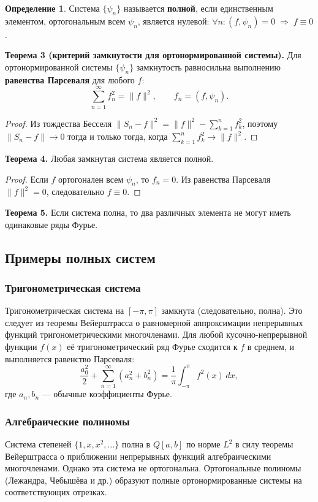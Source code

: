 \documentclass{article}
\theoremstyle{definition}
\newtheorem{definition}{Определение}
\begin{document}
\begin{definition}
Система $\{\psi_n\}$ называется \textbf{полной}, если единственным элементом, ортогональным всем $\psi_n$, является нулевой: $\forall n:(f,\psi_n)=0\;\Rightarrow\;f\equiv0$.
\end{definition}

\textbf{Теорема 3 (критерий замкнутости для ортонормированной системы).} Для ортонормированной системы $\{\psi_n\}$ замкнутость равносильна выполнению \textbf{равенства Парсеваля} для любого $f$:
\[
\sum_{n=1}^{\infty} f_n^2 = \|f\|^2,\qquad f_n=(f,\psi_n).
\]

\begin{proof}
Из тождества Бесселя $\|S_n-f\|^2 = \|f\|^2-\sum_{k=1}^n f_k^2$, поэтому $\|S_n-f\|\to0$ тогда и только тогда, когда $\sum_{k=1}^n f_k^2\to\|f\|^2$.
\end{proof}

\textbf{Теорема 4.} Любая замкнутая система является полной.
\begin{proof}
Если $f$ ортогонален всем $\psi_n$, то $f_n=0$. Из равенства Парсеваля $\|f\|^2=0$, следовательно $f\equiv0$.
\end{proof}

\textbf{Теорема 5.} Если система полна, то два различных элемента не могут иметь одинаковые ряды Фурье.

\subsection{Примеры полных систем}
\subsubsection{Тригонометрическая система}
Тригонометрическая система на $[-\pi,\pi]$ замкнута (следовательно, полна). Это следует из теоремы Вейерштрасса о равномерной аппроксимации непрерывных функций тригонометрическими многочленами. Для любой кусочно-непрерывной функции $f(x)$ её тригонометрический ряд Фурье сходится к $f$ в среднем, и выполняется равенство Парсеваля:
\[
\frac{a_0^2}{2}+\sum_{n=1}^{\infty}(a_n^2+b_n^2)=\frac{1}{\pi}\int_{-\pi}^{\pi}f^2(x)\,dx,
\]
где $a_n,b_n$ — обычные коэффициенты Фурье.

\subsubsection{Алгебраические полиномы}
Система степеней $\{1,x,x^2,\dots\}$ полна в $Q[a,b]$ по норме $L^2$ в силу теоремы Вейерштрасса о приближении непрерывных функций алгебраическими многочленами. Однако эта система не ортогональна. Ортогональные полиномы (Лежандра, Чебышёва и др.) образуют полные ортонормированные системы на соответствующих отрезках.
\end{document}
